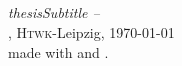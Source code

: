 \null
\vfill
\begin{flushright}
    \textbf{\thesisAuthor}\\
    \thesisAuthorAddress\\
    \href{mailto:\thesisAuthorEmail}{\thesisAuthorEmail}\\
    \href{http://\thesisAuthorWebsite}{\thesisAuthorWebsite}\\
    \vspace{12pt}
    \textit{\textbf{
	    \thesisTitle{}}
	    \ifcsname thesisSubtitle \endcsname
		    -- \thesisSubtitle
		\else
		\fi
		}\\
    \thesisDesignator{}, \textsc{Htwk}-Leipzig, \today\\
    \vspace{12pt}
    made with \XeTeX{} and \BibTeX{}.
\end{flushright}